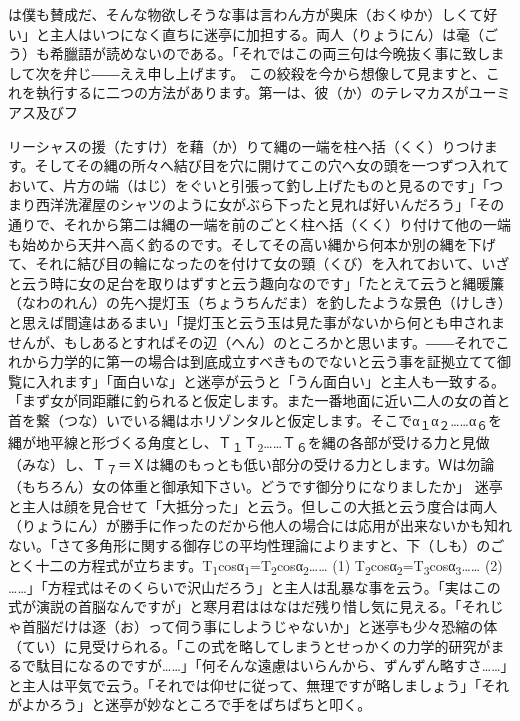 \documentclass{book}
\begin{document}
は僕も賛成だ、そんな物欲しそうな事は言わん方が奥床（おくゆか）しくて好い」と主人はいつになく直ちに迷亭に加担する。両人（りょうにん）は毫（ごう）も希臘語が読めないのである。「それではこの両三句は今晩抜く事に致しまして次を弁じ――ええ申し上げます。
この絞殺を今から想像して見ますと、これを執行するに二つの方法があります。第一は、彼（か）のテレマカスがユーミアス及びフ\begin{comment}\texttt{[image: ../../../gaiji/1-06/1-06-84.png]}\end{comment}リーシャスの援（たすけ）を藉（か）りて縄の一端を柱へ括（くく）りつけます。そしてその縄の所々へ結び目を穴に開けてこの穴へ女の頭を一つずつ入れておいて、片方の端（はじ）をぐいと引張って釣し上げたものと見るのです」「つまり西洋洗濯屋のシャツのように女がぶら下ったと見れば好いんだろう」「その通りで、それから第二は縄の一端を前のごとく柱へ括（くく）り付けて他の一端も始めから天井へ高く釣るのです。そしてその高い縄から何本か別の縄を下げて、それに結び目の輪になったのを付けて女の頸（くび）を入れておいて、いざと云う時に女の足台を取りはずすと云う趣向なのです」「たとえて云うと縄暖簾（なわのれん）の先へ提灯玉（ちょうちんだま）を釣したような景色（けしき）と思えば間違はあるまい」「提灯玉と云う玉は見た事がないから何とも申されませんが、もしあるとすればその辺（へん）のところかと思います。――それでこれから力学的に第一の場合は到底成立すべきものでないと云う事を証拠立てて御覧に入れます」「面白いな」と迷亭が云うと「うん面白い」と主人も一致する。
「まず女が同距離に釣られると仮定します。また一番地面に近い二人の女の首と首を繋（つな）いでいる縄はホリゾンタルと仮定します。そこでα\textsubscript{１}α\textsubscript{２}\ldots{}\ldots{}α\textsubscript{６}を縄が地平線と形づくる角度とし、Ｔ\textsubscript{１}Ｔ\textsubscript{2}\ldots{}\ldots{}Ｔ\textsubscript{６}を縄の各部が受ける力と見做（みな）し、Ｔ\textsubscript{７}＝Ｘは縄のもっとも低い部分の受ける力とします。Ｗは勿論（もちろん）女の体重と御承知下さい。どうです御分りになりましたか」
迷亭と主人は顔を見合せて「大抵分った」と云う。但しこの大抵と云う度合は両人（りょうにん）が勝手に作ったのだから他人の場合には応用が出来ないかも知れない。「さて多角形に関する御存じの平均性理論によりますと、下（しも）のごとく十二の方程式が立ちます。T\textsubscript{1}cosα\textsubscript{1}=T\textsubscript{2}cosα\textsubscript{2}\ldots{}\ldots{} (1) T\textsubscript{2}cosα\textsubscript{2}=T\textsubscript{3}cosα\textsubscript{3}\ldots{}\ldots{} (2) \ldots{}\ldots{}」「方程式はそのくらいで沢山だろう」と主人は乱暴な事を云う。「実はこの式が演説の首脳なんですが」と寒月君ははなはだ残り惜し気に見える。「それじゃ首脳だけは逐（お）って伺う事にしようじゃないか」と迷亭も少々恐縮の体（てい）に見受けられる。「この式を略してしまうとせっかくの力学的研究がまるで駄目になるのですが\ldots{}\ldots{}」「何そんな遠慮はいらんから、ずんずん略すさ\ldots{}\ldots{}」と主人は平気で云う。「それでは仰せに従って、無理ですが略しましょう」「それがよかろう」と迷亭が妙なところで手をぱちぱちと叩く。
\end{document}
